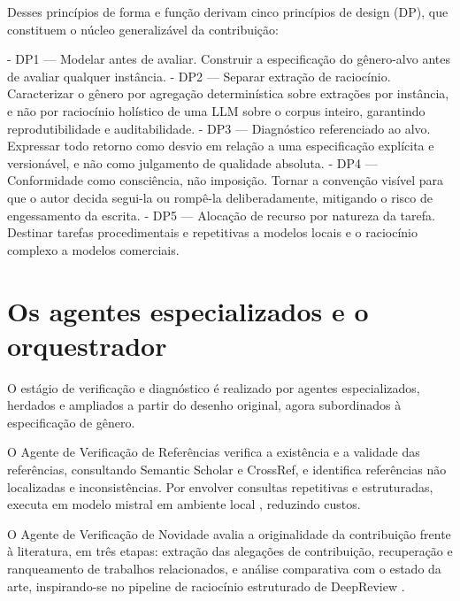 Desses princípios de forma e função derivam cinco princípios de design (DP), que constituem o núcleo generalizável da contribuição:

- DP1 — Modelar antes de avaliar. Construir a especificação do gênero-alvo antes de avaliar qualquer instância.
- DP2 — Separar extração de raciocínio. Caracterizar o gênero por agregação determinística sobre extrações por instância, e não por raciocínio holístico de uma LLM sobre o corpus inteiro, garantindo reprodutibilidade e auditabilidade.
- DP3 — Diagnóstico referenciado ao alvo. Expressar todo retorno como desvio em relação a uma especificação explícita e versionável, e não como julgamento de qualidade absoluta.
- DP4 — Conformidade como consciência, não imposição. Tornar a convenção visível para que o autor decida segui-la ou rompê-la deliberadamente, mitigando o risco de engessamento da escrita.
- DP5 — Alocação de recurso por natureza da tarefa. Destinar tarefas procedimentais e repetitivas a modelos locais e o raciocínio complexo a modelos comerciais.


\section{Os agentes especializados e o orquestrador}

O estágio de verificação e diagnóstico é realizado por agentes especializados, herdados e ampliados a partir do desenho original, agora subordinados à especificação de gênero.

O Agente de Verificação de Referências verifica a existência e a validade das referências, consultando Semantic Scholar e CrossRef, e identifica referências não localizadas e inconsistências. Por envolver consultas repetitivas e estruturadas, executa em modelo mistral \cite{mistral} em ambiente local , reduzindo custos.

O Agente de Verificação de Novidade avalia a originalidade da contribuição frente à literatura, em três etapas: extração das alegações de contribuição, recuperação e ranqueamento de trabalhos relacionados, e análise comparativa com o estado da arte, inspirando-se no pipeline de raciocínio estruturado de DeepReview \cite{DeepReview}.

